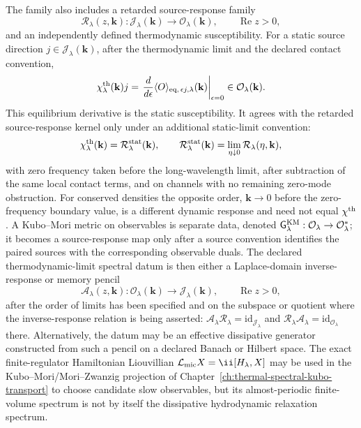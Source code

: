 \begin{definition}
The family also includes a retarded source-response family
\[
  \mathcal R_\lambda(z,\mathbf k):
  \mathcal J_\lambda(\mathbf k)\longrightarrow
  \mathcal O_\lambda(\mathbf k),
  \qquad \operatorname{Re}z>0,
\]
and an independently defined thermodynamic susceptibility.  For a static
source direction \(j\in\mathcal J_\lambda(\mathbf k)\), after the
thermodynamic limit and the declared contact convention,
\begin{equation}
  \chi^{\rm th}_\lambda(\mathbf k)j
  =
  \left.
  \frac{d}{d\epsilon}
  \langle O\rangle_{{\rm eq},\,\epsilon j,\lambda}(\mathbf k)
  \right|_{\epsilon=0}
  \in\mathcal O_\lambda(\mathbf k).
  \label{eq:hydro-thermodynamic-susceptibility}
\end{equation}
This equilibrium derivative is the static susceptibility.  It agrees with the
retarded source-response kernel only under an additional static-limit
convention:
\[
  \chi^{\rm th}_\lambda(\mathbf k)
  =
  \mathcal R^{\rm stat}_\lambda(\mathbf k),
  \qquad
  \mathcal R^{\rm stat}_\lambda(\mathbf k)
  =
  \lim_{\eta\downarrow0}\mathcal R_\lambda(\eta,\mathbf k),
\]
with zero frequency taken before the long-wavelength limit, after subtraction
of the same local contact terms, and on channels with no remaining zero-mode
obstruction.  For conserved densities the opposite order,
\(\mathbf k\to0\) before the zero-frequency boundary value, is a different
dynamic response and need not equal \(\chi^{\rm th}\).  A Kubo--Mori metric on
observables is separate data, denoted
\(\mathsf G^{\rm KM}_\lambda:\mathcal O_\lambda\to\mathcal O_\lambda^*\);
it becomes a source-response map only after a source convention identifies
the paired sources with the corresponding observable duals.  The declared
thermodynamic-limit spectral datum is then either a Laplace-domain
inverse-response or memory pencil
\[
  \mathcal A_\lambda(z,\mathbf k):
  \mathcal O_\lambda(\mathbf k)\longrightarrow
  \mathcal J_\lambda(\mathbf k),
  \qquad \operatorname{Re}z>0,
\]
after the order of limits has been specified and on the subspace or quotient
where the inverse-response relation is being asserted:
\(\mathcal A_\lambda\mathcal R_\lambda=\mathrm{id}_{\mathcal J_\lambda}\)
and
\(\mathcal R_\lambda\mathcal A_\lambda=\mathrm{id}_{\mathcal O_\lambda}\)
there.  Alternatively, the datum may be an effective dissipative generator
constructed from such a pencil on a declared Banach or Hilbert space.  The
exact finite-regulator Hamiltonian Liouvillian
\(\mathcal L_{\rm mic}X=\ii[H_\lambda,X]\) may be used in the
Kubo--Mori/Mori--Zwanzig projection of
Chapter~\ref{ch:thermal-spectral-kubo-transport} to choose candidate slow
observables, but its almost-periodic finite-volume spectrum is not by itself
the dissipative hydrodynamic relaxation spectrum.


\end{definition}
